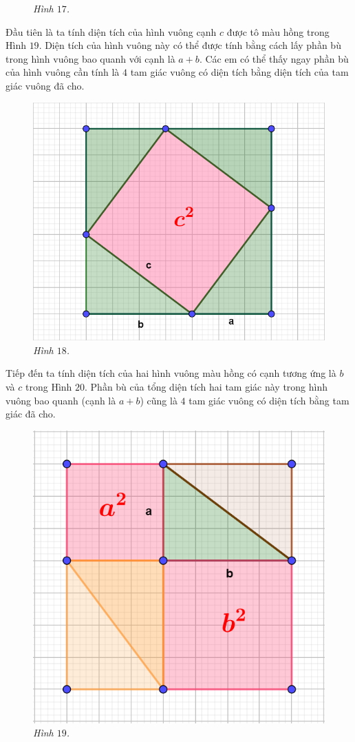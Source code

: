\begin{multicols}{2}
\begin{figure}[H]
		\caption{\small\textit{\color{toancuabi}Hình $17$.}}
		\vspace*{-10pt}
	\end{figure}
	Đầu tiên là ta tính diện tích của hình vuông cạnh $c$ được tô màu hồng trong Hình $19$. Diện tích của hình vuông này có thể được tính bằng cách lấy phần bù trong hình vuông bao quanh với cạnh là $a+b$. Các em có thể thấy ngay phần bù của hình vuông cần tính là $4$ tam giác vuông có diện tích bằng diện tích của tam giác vuông đã cho.
	\begin{figure}[H]
		\centering
		\vspace*{-5pt}
		\captionsetup{labelformat= empty, justification=centering}
		\includegraphics[width=0.5\linewidth]{18}
		\caption{\small\textit{\color{toancuabi}Hình $18$.}}
		\vspace*{-5pt}
	\end{figure}
	Tiếp đến ta tính diện tích của hai hình vuông màu hồng có cạnh tương ứng là $b$ và $c$ trong Hình $20$. Phần bù của tổng diện tích hai tam giác này trong hình vuông bao quanh (cạnh là $a+b$) cũng là $4$ tam giác vuông có diện tích bằng tam giác đã cho.
	\begin{figure}[H]
		\centering
		\vspace*{-5pt}
		\captionsetup{labelformat= empty, justification=centering}
		\includegraphics[width=0.48\linewidth]{19}
		\caption{\small\textit{\color{toancuabi}Hình $19$.}}

\end{figure}
\end{multicols}
